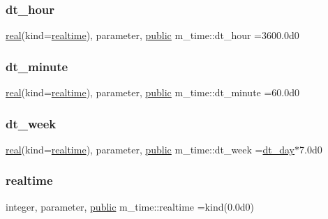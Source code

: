 \begin{DoxyVerb}
\subsubsection{\texorpdfstring{dt\+\_\+hour}{dt\_hour}}
{\footnotesize\ttfamily \hyperlink{read__watch_83_8txt_abdb62bde002f38ef75f810d3a905a823}{real}(kind=\hyperlink{namespacem__time_ac10ea9e8d59ec74eaa7d89f2517d7422}{realtime}), parameter, \hyperlink{M__stopwatch_83_8txt_a2f74811300c361e53b430611a7d1769f}{public} m\+\_\+time\+::dt\+\_\+hour =3600.\+0d0}

\mbox{\label{namespacem__time_a9fe6fbb44e2779a2fcf96fba36c08918}} 
\subsubsection{\texorpdfstring{dt\+\_\+minute}{dt\_minute}}
{\footnotesize\ttfamily \hyperlink{read__watch_83_8txt_abdb62bde002f38ef75f810d3a905a823}{real}(kind=\hyperlink{namespacem__time_ac10ea9e8d59ec74eaa7d89f2517d7422}{realtime}), parameter, \hyperlink{M__stopwatch_83_8txt_a2f74811300c361e53b430611a7d1769f}{public} m\+\_\+time\+::dt\+\_\+minute =60.\+0d0}

\mbox{\label{namespacem__time_a3d53519e90264faccdae67e389ffc003}} 
\subsubsection{\texorpdfstring{dt\+\_\+week}{dt\_week}}
{\footnotesize\ttfamily \hyperlink{read__watch_83_8txt_abdb62bde002f38ef75f810d3a905a823}{real}(kind=\hyperlink{namespacem__time_ac10ea9e8d59ec74eaa7d89f2517d7422}{realtime}), parameter, \hyperlink{M__stopwatch_83_8txt_a2f74811300c361e53b430611a7d1769f}{public} m\+\_\+time\+::dt\+\_\+week =\hyperlink{namespacem__time_a97725f8d657c24badff19a794f323a6b}{dt\+\_\+day}$\ast$7.\+0d0}

\mbox{\label{namespacem__time_ac10ea9e8d59ec74eaa7d89f2517d7422}} 
\subsubsection{\texorpdfstring{realtime}{realtime}}
{\footnotesize\ttfamily integer, parameter, \hyperlink{M__stopwatch_83_8txt_a2f74811300c361e53b430611a7d1769f}{public} m\+\_\+time\+::realtime =kind(0.\+0d0)}


\end{DoxyVerb}
